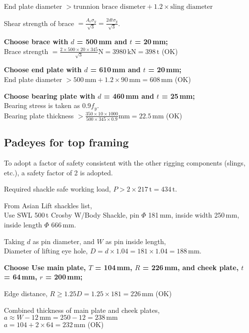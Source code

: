 \documentclass[a4paper,10pt]{article}
\begin{document}
End plate diameter $> \text{trunnion brace dismeter} + 1.2 \times 
                      \text{sling diameter}$

Shear strength of brace $= \frac{A_v \sigma_y}{\sqrt{3}} 
                         = \frac{2 d t \sigma_y}{\sqrt{3}}$.

{\bf Choose brace with $d$ = 500\,mm and $t$ = 20\,mm;} \\
Brace strength $= \frac{2 \times 500 \times 20 \times 345}{\sqrt{3}} \mathrm{N}
                = 3980\,\mathrm{kN}
                = 398\,\mathrm{t}$ (OK)

{\bf Choose end plate with $d$ = 610\,mm and $t$ = 20\,mm;} \\
End plate diameter $> 500\,\mathrm{mm} + 1.2 \times 90\,\mathrm{mm}
                    = 608\,\mathrm{mm}$ (OK)

{\bf Choose bearing plate with $d$ = 460\,mm and $t$ = 25\,mm;} \\
Bearing stress is taken as 0.9$f_y$. \\
Bearing plate thickness $> \frac{350 \times 10 \times 1000}
                                 {500 \times 345 \times 0.9} \mathrm{mm}
                         = 22.5\,\mathrm{mm}$ (OK)

\subsection*{Padeyes for top framing}
To adopt a factor of safety consistent with the other rigging components
(slings, etc.), a safety factor of 2 is adopted.

Required shackle safe working load, $P > 2 \times 217\,\mathrm{t} = 434\,\mathrm{t}$.

From Asian Lift shackles list, \\
Use SWL 500\,t Crosby W/Body Shackle, pin $\Phi$ 181\,mm, 
inside width 250\,mm, inside length $\Phi$ 666\,mm.

Taking $d$ as pin diameter, and $W$ as pin inside length, \\
Diameter of lifting eye hole, $D = d \times 1.04 = 181 \times 1.04 
                                 = 188\,\mathrm{mm}$.

{\bf Choose Use main plate, $T$ = 104\,mm, $R$ = 226\,mm, and 
cheek plate, $t$ = 64\,mm, $r$ = 200\,mm;}

Edge distance, $R \ge 1.25 D = 1.25 \times 181 = 226\,\mathrm{mm}$ (OK)

Combined thickness of main plate and cheek plates, 
$a \approx W - 12\,\mathrm{mm} = 250 - 12 = 238\,\mathrm{mm}$ \\
$a = 104 + 2 \times 64 = 232\,\mathrm{mm}$ (OK)
\end{document}
